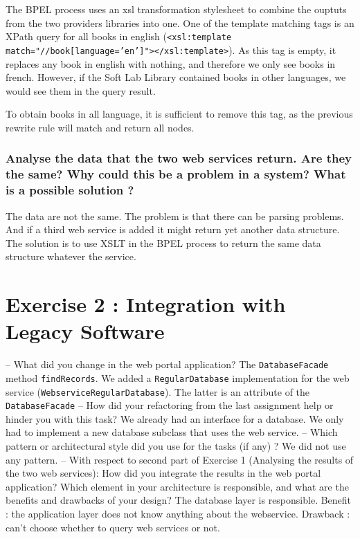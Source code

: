 The BPEL process uses an xsl transformation stylesheet to combine the ouptuts from the two providers libraries into one. One of the template matching tags is an XPath query for all books in english (\texttt{<xsl:template match="//book[language='en']"></xsl:template>}). As this tag is empty, it replaces any book in english with nothing, and therefore we only see books in french. However, if the Soft Lab Library contained books in other languages, we would see them in the query result.

To obtain books in all language, it is sufficient to remove this tag, as the previous rewrite rule will match and return all nodes.

\subsubsection{Analyse the data that the two web services return. Are they the same? Why
could this be a problem in a system? What is a possible solution ?}

The data are not the same. The problem is that there can be parsing problems. And if a third web service is added it might return yet another data structure. The solution is to use XSLT in the BPEL process to return the same data structure whatever the service.

\section{Exercise 2 : Integration with Legacy Software}

    – What did you change in the web portal application?
    The \texttt{DatabaseFacade} method \texttt{findRecords}. We added a \texttt{RegularDatabase} implementation for the web service (\texttt{WebserviceRegularDatabase}). The latter is an attribute of the \texttt{DatabaseFacade}
    – How did your refactoring from the last assignment help or hinder you with
    this task?
    We already had an interface for a database. We only had to implement a new database subclass that uses the web service.
    – Which pattern or architectural style did you use for the tasks (if any) ?
    We did not use any pattern.
    – With respect to second part of Exercise 1 (Analysing the results of the two
    web services): How did you integrate the results in the web portal application?
    Which element in your architecture is responsible, and what are the benefits
    and drawbacks of your design?
    The database layer is responsible. Benefit : the application layer does not know anything about the webservice. Drawback : can't choose whether to query web services or not.

